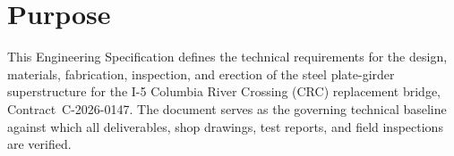 \section{Purpose}

This Engineering Specification defines the technical requirements for the design, materials,
fabrication, inspection, and erection of the steel plate-girder superstructure for the
I-5 Columbia River Crossing (CRC) replacement bridge, Contract\ C-2026-0147. The document
serves as the governing technical baseline against which all deliverables, shop drawings,
test reports, and field inspections are verified.

